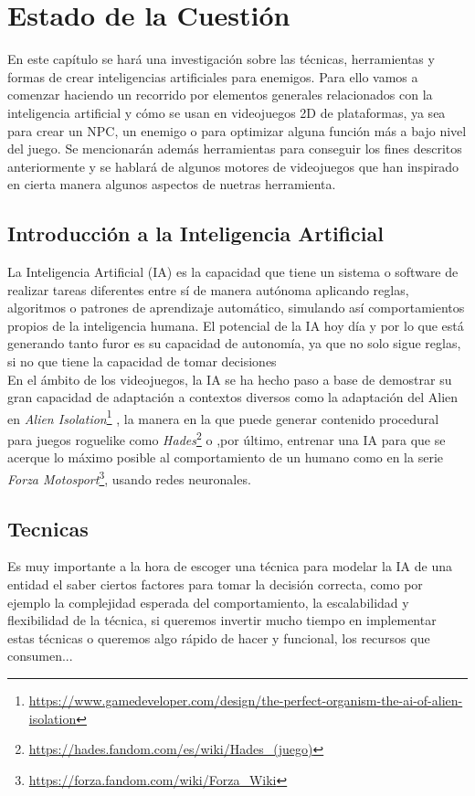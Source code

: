 \chapter{Estado de la Cuestión}
\label{cap:estadoDeLaCuestion}
En este capítulo se hará una investigación sobre las técnicas, herramientas y formas de crear inteligencias artificiales para enemigos.
Para ello vamos a comenzar haciendo un recorrido por elementos generales relacionados con la inteligencia artificial y cómo se usan en videojuegos 2D de plataformas, ya sea para crear un NPC, un enemigo o para optimizar alguna función más a bajo nivel del juego.
Se mencionarán además herramientas para conseguir los fines descritos anteriormente y se hablará de algunos motores de videojuegos que han inspirado en cierta manera algunos aspectos de nuetras herramienta. \\
\section{Introducción a la Inteligencia Artificial}

La Inteligencia Artificial (IA) es la capacidad que tiene un sistema o software de realizar tareas diferentes entre sí de manera autónoma aplicando reglas, algoritmos o patrones de aprendizaje automático, simulando así comportamientos propios de la inteligencia humana.
El potencial de la IA hoy día y por lo que está generando tanto furor es su capacidad de autonomía, ya que no solo sigue reglas, si no que tiene la capacidad de tomar decisiones\\
En el ámbito de los videojuegos, la IA se ha hecho paso a base de demostrar su gran capacidad de adaptación a contextos diversos como la adaptación del Alien en \textit{Alien Isolation}\footnote{\url{https://www.gamedeveloper.com/design/the-perfect-organism-the-ai-of-alien-isolation}} , la manera en la que puede generar contenido procedural para juegos roguelike como \textit{Hades}\footnote{\url{https://hades.fandom.com/es/wiki/Hades_(juego)}} o ,por último, entrenar una IA para que se acerque lo máximo posible al comportamiento de un humano como en la serie \textit{Forza Motosport}\footnote{\url{https://forza.fandom.com/wiki/Forza_Wiki}}, usando redes neuronales.\\
\section{Tecnicas}

Es muy importante a la hora de escoger una técnica para modelar la IA de una entidad el saber ciertos factores para tomar la decisión correcta, como por ejemplo la complejidad esperada del comportamiento, la escalabilidad y flexibilidad de la técnica, si queremos invertir mucho tiempo en implementar estas técnicas o queremos algo rápido de hacer y funcional, los recursos que consumen... \\

